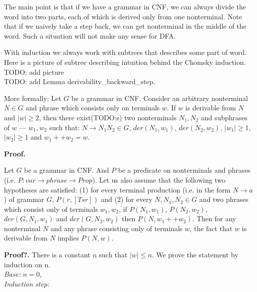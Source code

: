 The main point is that if we have a grammar in CNF, we can always divide the word into two parts, each of which is derived only from one nonterminal. Note that if we naively take a step back, we can get nonterminal in the middle of the word. Such a situation will not make any sense for DFA.

With induction we always work with subtrees that describes some part of word. Here is a picture of subtree describing intuition behind the Chomsky induction. \\
TODO: add picture\\ 
TODO: add Lemma derivability\_backward\_step.

More formally: 
Let $G$ be a grammar in CNF. Consider an arbitrary nonterminal $N \in G$ and phrase which consists only on terminals $w$. 
If $w$ is derivable from $N$ and $|w| \ge 2$, then there exist(TODO:s) two nonterminals $N_1, N_2$ and subphrases of $w$ --- $w_1, w_2$ such that: $N \to N_1 N_2 \in G$, $der(N_1, w_1)$, $der(N_2, w_2)$, $|w_1| \ge 1$, $|w_2| \ge 1$ and $w_1 ++ w_2 = w$.

\textbf{Proof.}

Let $G$ be a grammar in CNF. And $P$ be a predicate on nonterminals and phrases (i.e. $P: var \to phrase \to Prop$).
Let us also assume that the following two hypotheses are satisfied:
(1) for every terminal production (i.e. in the form $N \to a$) of grammar $G$, $P(r, [Ts r])$ and (2) for every $N, N_1, N_2 \in G$ and two phrases which consist only of terminals $w_1, w_2$, if $P(N_1, w_1)$, $P(N_2, w_2)$, $der(G, N_1, w_1)$ and $der(G, N_2, w_2)$ then $P(N, w_1 ++ w_2)$.
Then for any nonterminal $N$ and any phrase consisting only of terminals $w$, the fact that $w$ is derivable from $N$ implies $P(N,w)$.

\textbf{Proof?.} 
There is a constant $n$ such that $| w | \le n$. 
We prove the statement by induction on n. \\
\textit{Base:} $n = 0$, \\
\textit{Induction step: } \\








